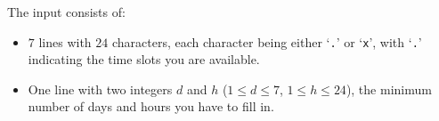 
    The input consists of:
    \begin{itemize}
        \item $7$ lines with $24$ characters, each character being
            either `\texttt{.}' or `\texttt{x}', with `\texttt{.}' indicating the time
            slots you are available.
        \item One line with two integers $d$ and $h$ ($1 \leq d \leq 7$, $1 \leq h \leq 24$),
            the minimum number of days and hours you have to fill in.
    \end{itemize}
